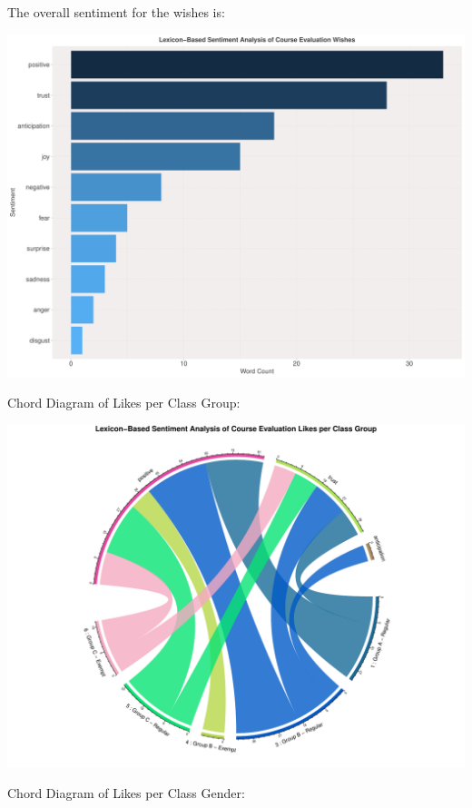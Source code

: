 \documentclass[
]{article}
\begin{document}
The overall sentiment for the wishes is:

\includegraphics{AnalysisOfCourseEvaluation-Notebook_files/figure-latex/OverallSentimentForWishes-1.pdf}

\newpage

Chord Diagram of Likes per Class Group:

\includegraphics{AnalysisOfCourseEvaluation-Notebook_files/figure-latex/ChordDiagramLikesPerGroup-1.pdf}

\newpage

Chord Diagram of Likes per Class Gender:
\end{document}
